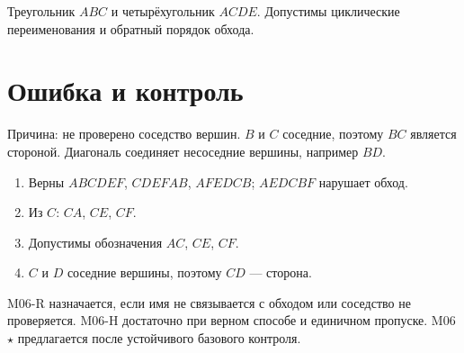 \begin{practicebox}
  Треугольник $ABC$ и четырёхугольник $ACDE$. Допустимы циклические
  переименования и обратный порядок обхода.
\end{practicebox}

\section{Ошибка и контроль}

\begin{warningbox}
  Причина: не проверено соседство вершин. $B$ и $C$ соседние, поэтому $BC$
  является стороной. Диагональ соединяет несоседние вершины, например $BD$.
\end{warningbox}

\begin{checkpointbox}[Ответы]
  \begin{enumerate}[label=\textbf{\arabic*.}]
    \item Верны $ABCDEF$, $CDEFAB$, $AFEDCB$; $AEDCBF$ нарушает обход.
    \item Из $C$: $CA$, $CE$, $CF$.
    \item Допустимы обозначения $AC$, $CE$, $CF$.
    \item $C$ и $D$ соседние вершины, поэтому $CD$ --- сторона.
  \end{enumerate}
\end{checkpointbox}

\begin{teacherbox}
  M06-R назначается, если имя не связывается с обходом или соседство не
  проверяется. M06-H достаточно при верном способе и единичном пропуске.
  M06\(\star\) предлагается после устойчивого базового контроля.
\end{teacherbox}
